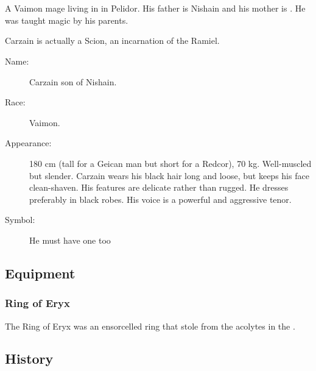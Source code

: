 \section{\CarzainShachar}
A Vaimon mage living in \Redglen{} in Pelidor. 
His father is Nishain \Shireyo{} and his mother is \Roanne{} \Deracille. 
He was taught magic by his parents. 

Carzain is actually a Scion, an incarnation of the \Malach{} Ramiel. 

\begin{description}
  \item[Name:] {Carzain} son of {Nishain}. 
  \item[Race:] Vaimon. 
  \item[Appearance:] 
    180 cm (tall for a Geican man but short for a Redcor), 70 kg. Well-muscled but slender. Carzain wears his black hair long and loose, but keeps his face clean-shaven. His features are delicate rather than rugged. He dresses preferably in black robes. His voice is a powerful and aggressive tenor. 
  \item[Symbol:] He must have one too\prikker 
\end{description}









\subsection{Equipment}





\subsubsection{Ring of Eryx}
The Ring of Eryx was an ensorcelled ring that \CarzainShachar stole from the acolytes in the .









\subsection{History}





